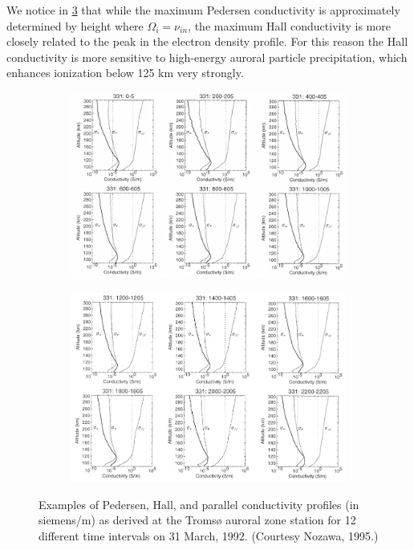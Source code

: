 We notice in \cref{fig:L14_three_currents} that while the maximum Pedersen conductivity is approximately determined by height where \(\Omega_i=\nu_{in}\), the maximum Hall conductivity is more closely related to the peak in the electron density profile. For this reason the Hall conductivity is more sensitive to high-energy auroral particle precipitation, which enhances ionization below 125 km very strongly.
\begin{figure}[t]
    \centering
    \begin{subfigure}[t]{.9\linewidth}
        \centering
        \includegraphics[width=.7\linewidth, angle=270]{bilder/L14_three_currents1.png}
        \caption{}\label{fig:L14_three_currents1}
    \end{subfigure}

    \begin{subfigure}[t]{.9\linewidth}
        \centering
        \includegraphics[width=.7\linewidth, angle=270]{bilder/L14_three_currents2.png}
        \caption{}\label{fig:L14_three_currents2}
    \end{subfigure}

    \caption{Examples of Pedersen, Hall, and parallel conductivity profiles (in siemens/m) as derived at the Tromsø auroral zone station for 12 different time intervals on 31 March, 1992. (Courtesy Nozawa, 1995.)}\label{fig:L14_three_currents}
\end{figure}

